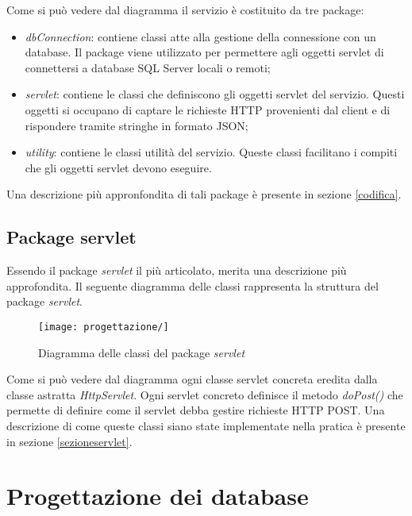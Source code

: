 Come si può vedere dal diagramma il servizio è costituito da tre package:
\begin{itemize}
	\item \textit{dbConnection}: contiene classi atte alla gestione della connessione con un database. Il package viene utilizzato per permettere agli oggetti servlet di connettersi a database SQL Server locali o remoti;
	\item \textit{servlet}: contiene le classi che definiscono gli oggetti servlet del servizio. Questi oggetti si occupano di captare le richieste HTTP provenienti dal client e di rispondere tramite stringhe in formato JSON;
	\item \textit{utility}: contiene le classi utilità del servizio. Queste classi facilitano i compiti che gli oggetti servlet devono eseguire.
\end{itemize}
Una descrizione più appronfondita di tali package è presente in sezione \ref{codifica}.

\subsection{Package servlet}

Essendo il package \textit{servlet} il più articolato, merita una descrizione più approfondita. Il seguente diagramma delle classi rappresenta la struttura del package \textit{servlet}.

\begin{figure}[!h] 
    \centering 
    \texttt{[image: progettazione/]} 
    \caption{Diagramma delle classi del package \textit{servlet}}
\end{figure}

Come si può vedere dal diagramma ogni classe servlet concreta eredita dalla classe astratta \textit{HttpServlet}. Ogni servlet concreto definisce il metodo \textit{doPost()} che permette di definire come il servlet debba gestire richieste HTTP POST. Una descrizione di come queste classi siano state implementate nella pratica è presente in sezione \ref{sezioneservlet}.

\section{Progettazione dei database}

